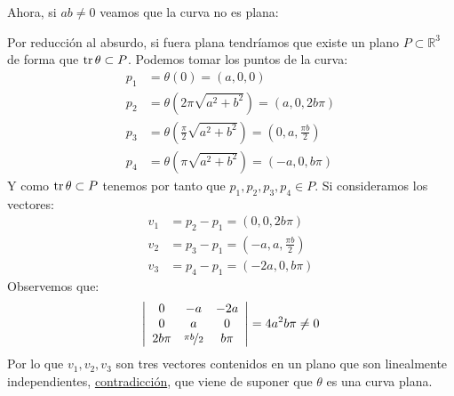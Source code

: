 \begin{ejemplo}
\begin{enumerate}

            \noindent
            Ahora, si $ab\neq 0$ veamos que la curva no es plana:

            \noindent
            Por reducción al absurdo, si fuera plana tendríamos que existe un plano $P\subset \mathbb{R}^3$ de forma que $\operatorname{tr} \theta\subset P$. Podemos tomar los puntos de la curva:
            \begin{align*}
                p_1 &= \theta(0) = (a, 0, 0) \\
                p_2 &= \theta\left(2\pi\sqrt{a^2+b^2}\right) = (a, 0, 2b\pi) \\
                p_3 &= \theta\left(\frac{\pi}{2}\sqrt{a^2+b^2}\right) = \left(0, a, \frac{\pi b}{2}\right) \\
                p_4 &= \theta\left(\pi \sqrt{a^2+b^2}\right) = (-a, 0, b\pi)
            \end{align*}
            Y como $\operatorname{tr}\theta\subset P$ tenemos por tanto que $p_1,p_2,p_3,p_4\in P$. Si consideramos los vectores:
            \begin{align*}
                v_1 &= p_2 - p_1 = (0, 0, 2b\pi) \\
                v_2 &= p_3 - p_1 = \left(-a, a, \frac{\pi b}{2}\right) \\
                v_3 &= p_4 - p_1 = (-2a, 0, b\pi)
            \end{align*}
            Observemos que:
            \begin{equation*}
                \left|\begin{array}{ccc}
                    0 & -a & -2a \\
                    0 & a & 0 \\
                    2b\pi & \nicefrac{\pi b}{2} & b\pi
                \end{array}\right| = 4a^2b\pi \neq 0
            \end{equation*}
            Por lo que $v_1,v_2,v_3$ son tres vectores contenidos en un plano que son linealmente independientes, \underline{contradicción}, que viene de suponer que $\theta$ es una curva plana.


\end{enumerate}
\end{ejemplo}
